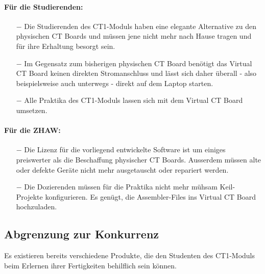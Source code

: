 \documentclass[10pt]{article}
\begin{document}
\paragraph{Für die Studierenden:}
\begin{itemize}
\item[$-$] Die Studierenden des CT1-Moduls haben eine elegante Alternative zu den physischen CT Boards und müssen jene nicht mehr nach Hause tragen und für ihre Erhaltung besorgt sein.
\item[$-$] Im Gegensatz zum bisherigen physischen CT Board benötigt das \glqq Virtual CT Board\grqq{} keinen direkten Stromanschluss und lässt sich daher überall - also beispielsweise auch unterwegs - direkt auf dem Laptop starten.
\item[$-$] Alle Praktika des CT1-Moduls lassen sich mit dem \glqq Virtual CT Board\grqq{} umsetzen.
\end{itemize}

\paragraph{Für die ZHAW:}
\begin{itemize}
\item[$-$] Die Lizenz für die vorliegend entwickelte Software ist um einiges preiswerter als die Beschaffung physischer CT Boards. Ausserdem müssen alte oder defekte Geräte nicht mehr ausgetauscht oder repariert werden.
\item[$-$] Die Dozierenden müssen für die Praktika nicht mehr mühsam Keil-Projekte konfigurieren. Es genügt, die Assembler-Files ins \glqq Virtual CT Board\grqq{} hochzuladen.
\end{itemize}

\subsection{Abgrenzung zur Konkurrenz}

Es existieren bereits verschiedene Produkte, die den Studenten des CT1-Moduls beim Erlernen ihrer Fertigkeiten behilflich sein können.
\end{document}
